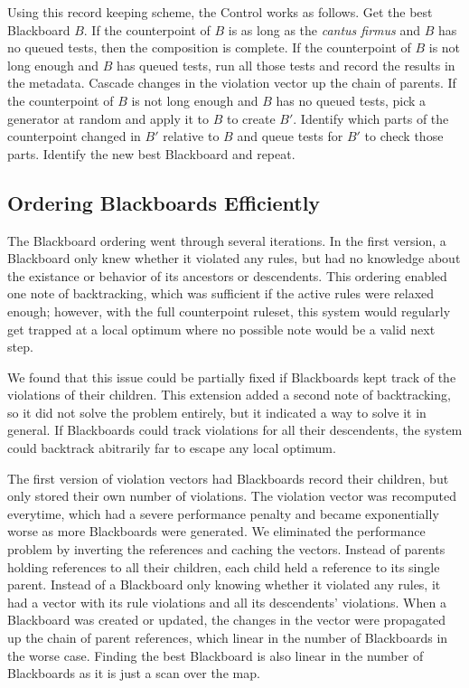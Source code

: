 Using this record keeping scheme, the Control works as follows.
Get the best Blackboard $B$.
If the counterpoint of $B$ is as long as the \emph{cantus firmus} and $B$ has no queued tests, then the composition is complete.
If the counterpoint of $B$ is not long enough and $B$ has queued tests, run all those tests and record the results in the metadata. 
  Cascade changes in the violation vector up the chain of parents.
If the counterpoint of $B$ is not long enough and $B$ has no queued tests, pick a generator at random and apply it to $B$ to create $B'$.
  Identify which parts of the counterpoint changed in $B'$ relative to $B$ and queue tests for $B'$ to check those parts.
Identify the new best Blackboard and repeat.

\subsection{Ordering Blackboards Efficiently}
The Blackboard ordering went through several iterations.
In the first version, a Blackboard only knew whether it violated any rules, but had no knowledge about the existance or behavior of its ancestors or descendents.
This ordering enabled one note of backtracking, which was sufficient if the active rules were relaxed enough;
however, with the full counterpoint ruleset, this system would regularly get trapped at a local optimum where no possible note would be a valid next step.

We found that this issue could be partially fixed if Blackboards kept track of the violations of their children. 
This extension added a second note of backtracking, so it did not solve the problem entirely, but it indicated a way to solve it in general.
If Blackboards could track violations for all their descendents, the system could backtrack abitrarily far to escape any local optimum.

The first version of violation vectors had Blackboards record their children, but only stored their own number of violations.
The violation vector was recomputed everytime, which had a severe performance penalty and became exponentially worse as more Blackboards were generated.
We eliminated the performance problem by inverting the references and caching the vectors.
Instead of parents holding references to all their children, each child held a reference to its single parent.
Instead of a Blackboard only knowing whether it violated any rules, it had a vector with its rule violations and all its descendents' violations.
When a Blackboard was created or updated, the changes in the vector were propagated up the chain of parent references, which linear in the number of Blackboards in the worse case.
Finding the best Blackboard is also linear in the number of Blackboards as it is just a scan over the map.

